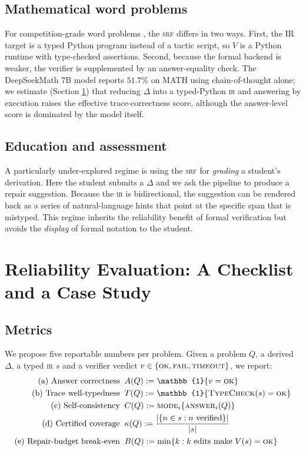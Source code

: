 \documentclass[11pt,a4paper]{article}
\newcommand{\IR}{\textsc{ir}}
\newcommand{\IRpipeline}{\textsc{srf}}
\begin{document}
\subsection{Mathematical word problems}
For competition-grade word problems
\citep{cobbe2021gsm8k,hendrycks2021math,shao2024deepseekmath},
the \IRpipeline{} differs in two ways.  First, the IR target is a
typed Python program instead of a tactic script, so $V$ is a Python
runtime with type-checked assertions.  Second, because the formal
backend is weaker, the verifier is supplemented by an
answer-equality check.  The DeepSeekMath 7B model reports $51.7\%$
on MATH using chain-of-thought alone; we estimate (Section
\ref{sec:eval}) that reducing $\Delta$ into a typed-Python \IR{}
and answering by execution raises the effective trace-correctness
score, although the answer-level score is dominated by the model
itself.

\subsection{Education and assessment}
A particularly under-explored regime is using the \IRpipeline{} for
\emph{grading} a student's derivation.  Here the student submits a
$\Delta$ and we ask the pipeline to produce a repair suggestion.
Because the \IR{} is bidirectional, the suggestion can be rendered
back as a series of natural-language hints that point at the
specific span that is mistyped.  This regime inherits the
reliability benefit of formal verification but avoids the
\emph{display} of formal notation to the student.

\section{Reliability Evaluation: A Checklist and a Case Study}
\label{sec:eval}

\subsection{Metrics}

We propose five reportable numbers per problem.  Given a problem
$Q$, a derived $\Delta$, a typed \IR{} $s$ and a verifier
verdict $v \in \{\textsc{ok}, \textsc{fail}, \textsc{timeout}\}$, we
report:
\begin{align*}
  \text{(a) Answer correctness}     &\;\; A(Q) := \mathbb{1}\{v = \textsc{ok}\}\\
  \text{(b) Trace well-typedness}    &\;\; T(Q) := \mathbb{1}\{\textsc{TypeCheck}(s) = \textsc{ok}\}\\
  \text{(c) Self-consistency}        &\;\; C(Q) := \textsc{mode}_{i}\{\textsc{answer}_i(Q)\}\\
  \text{(d) Certified coverage}     &\;\; \kappa(Q) := \frac{|\{n \in s : n \text{ verified}\}|}{|s|}\\
  \text{(e) Repair-budget break-even} &\;\; B(Q) := \min\{k : \text{$k$ edits make }V(s)=\textsc{ok}\}
\end{align*}
\end{document}
